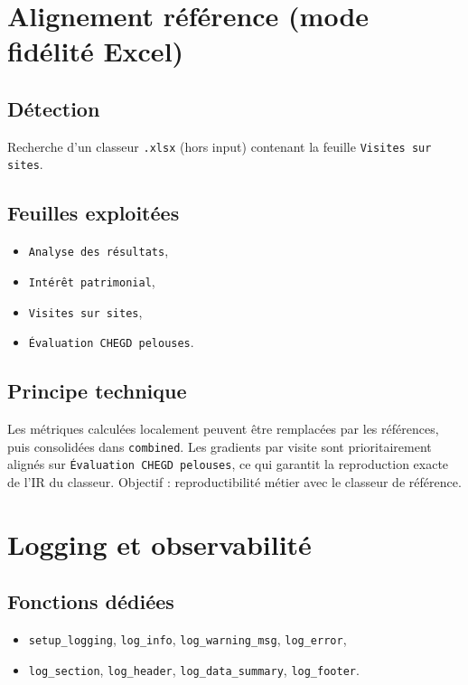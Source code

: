\documentclass[11pt,a4paper]{article}
\begin{document}
\section{Alignement référence (mode fidélité Excel)}
\subsection{Détection}
Recherche d'un classeur \texttt{.xlsx} (hors input) contenant la feuille
\texttt{Visites sur sites}.

\subsection{Feuilles exploitées}
\begin{itemize}[leftmargin=1.2cm]
  \item \texttt{Analyse des résultats},
  \item \texttt{Intérêt patrimonial},
  \item \texttt{Visites sur sites},
  \item \texttt{Évaluation CHEGD pelouses}.
\end{itemize}

\subsection{Principe technique}
Les métriques calculées localement peuvent être remplacées par les références,
puis consolidées dans \texttt{combined}.
Les gradients par visite sont prioritairement alignés sur
\texttt{Évaluation CHEGD pelouses}, ce qui garantit la reproduction exacte de l'IR du classeur.
Objectif : reproductibilité métier avec le classeur de référence.

\section{Logging et observabilité}
\subsection{Fonctions dédiées}
\begin{itemize}[leftmargin=1.2cm]
  \item \texttt{setup\_logging}, \texttt{log\_info}, \texttt{log\_warning\_msg}, \texttt{log\_error},
  \item \texttt{log\_section}, \texttt{log\_header}, \texttt{log\_data\_summary}, \texttt{log\_footer}.
\end{itemize}
\end{document}
